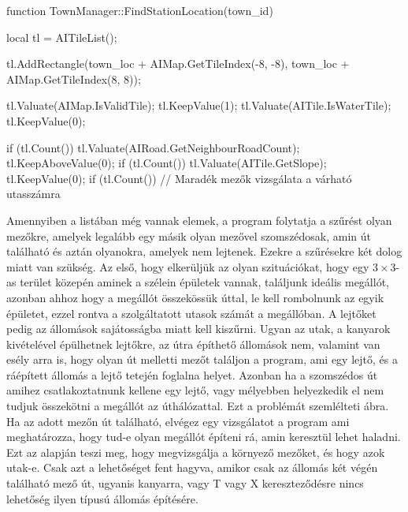 \begin{cpp}
function TownManager::FindStationLocation(town_id) {
  local tl = AITileList();
  
  tl.AddRectangle(town_loc + AIMap.GetTileIndex(-8, -8),
   town_loc + AIMap.GetTileIndex(8, 8));
   
  tl.Valuate(AIMap.IsValidTile);
  tl.KeepValue(1);
  tl.Valuate(AITile.IsWaterTile);
  tl.KeepValue(0);
  
  if (tl.Count()) {
    tl.Valuate(AIRoad.GetNeighbourRoadCount);
  	tl.KeepAboveValue(0);
  	if (tl.Count()) {
      tl.Valuate(AITile.GetSlope);
      tl.KeepValue(0);
      if (tl.Count()) {
      	// Maradék mezők vizsgálata a várható utasszámra
      }
    }
  }
}
\end{cpp}

Amennyiben a listában még vannak elemek, a program folytatja a szűrést olyan mezőkre, amelyek legalább egy másik olyan mezővel szomszédosak, amin út található és aztán olyanokra, amelyek nem lejtenek. Ezekre a szűrésekre két dolog miatt van szükség. Az első, hogy elkerüljük az olyan szituációkat, hogy egy $3 \times 3$-as terület közepén aminek a szélein épületek vannak, találjunk ideális megállót, azonban ahhoz hogy a megállót összekössük úttal, le kell rombolnunk az egyik épületet, ezzel rontva a szolgáltatott utasok számát a megállóban. A lejtőket pedig az állomások sajátosságba miatt kell kiszűrni. Ugyan az utak, a kanyarok kivételével épülhetnek lejtőkre, az útra építhető állomások nem, valamint van esély arra is, hogy olyan út melletti mezőt találjon a program, ami egy lejtő, és a ráépített állomás a lejtő tetején foglalna helyet. Azonban ha a szomszédos út amihez csatlakoztatnunk kellene egy lejtő, vagy mélyebben helyezkedik el nem tudjuk összekötni a megállót az úthálózattal. Ezt a problémát szemlélteti  ábra. Ha az adott mezőn út található, elvégez egy vizsgálatot a program ami meghatározza, hogy tud-e olyan megállót építeni rá, amin keresztül lehet haladni. Ezt az alapján teszi meg, hogy megvizsgálja a környező mezőket, és hogy azok utak-e. Csak azt a lehetőséget fent hagyva, amikor csak az állomás két végén található mező út, ugyanis kanyarra, vagy T vagy X kereszteződésre nincs lehetőség ilyen típusú állomás építésére.

